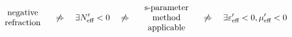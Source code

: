 






\begin{equation}
\begin{array}{c} \text{negative}\\ \text{refraction} \end{array}
\quad\not\Rightarrow\quad  \exists N_{\text{eff} }' < 0 
\quad\not\Rightarrow\quad \begin{array}{c} \text{s-parameter}\\ \text{method}\\ \text{applicable}  \end{array}
\quad\not\Rightarrow\quad \exists \varepsilon_{\text{eff} }'<0, \mu_{\text{eff} }'<0  
\label{eq_implications}\end{equation} %



